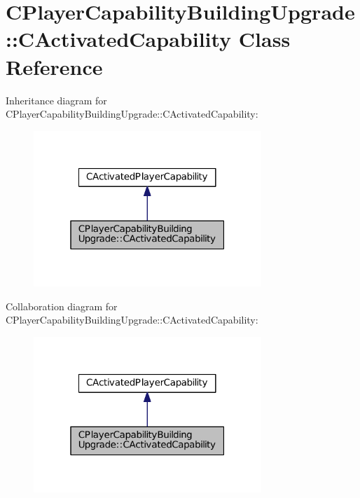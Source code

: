 \hypertarget{classCPlayerCapabilityBuildingUpgrade_1_1CActivatedCapability}{}\section{C\+Player\+Capability\+Building\+Upgrade\+:\+:C\+Activated\+Capability Class Reference}
\label{classCPlayerCapabilityBuildingUpgrade_1_1CActivatedCapability}


Inheritance diagram for C\+Player\+Capability\+Building\+Upgrade\+:\+:C\+Activated\+Capability\+:
\nopagebreak
\begin{figure}[H]
\begin{center}
\leavevmode
\includegraphics[width=244pt]{classCPlayerCapabilityBuildingUpgrade_1_1CActivatedCapability__inherit__graph}
\end{center}
\end{figure}


Collaboration diagram for C\+Player\+Capability\+Building\+Upgrade\+:\+:C\+Activated\+Capability\+:
\nopagebreak
\begin{figure}[H]
\begin{center}
\leavevmode
\includegraphics[width=244pt]{classCPlayerCapabilityBuildingUpgrade_1_1CActivatedCapability__coll__graph}
\end{center}
\end{figure}
